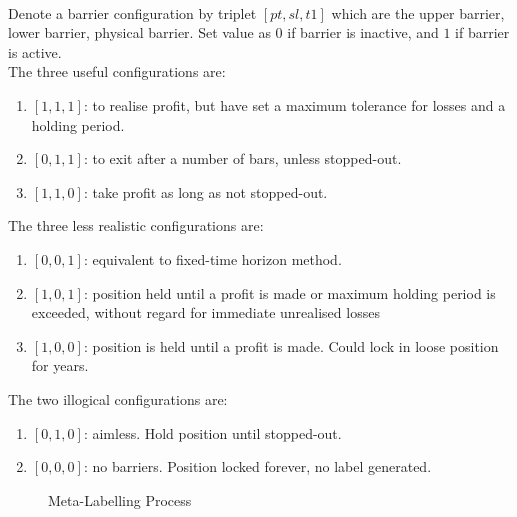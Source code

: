 \begin{remark} \\
Denote a barrier configuration by triplet $[pt, sl, t1]$ which are the upper barrier, lower barrier, physical barrier. Set value as $0$ if barrier is inactive, and $1$ if barrier is active.\\
The three useful configurations are:
\begin{enumerate}[label=\roman*.]
\setlength{\itemsep}{0pt}
\item $[1,1,1]$: to realise profit, but have set a maximum tolerance for losses and a holding period.
\item $[0,1,1]$: to exit after a number of bars, unless stopped-out.
\item $[1,1,0]$: take profit as long as not stopped-out.
\end{enumerate}
The three less realistic configurations are:
\begin{enumerate}[label=\roman*.]
\setlength{\itemsep}{0pt}
\item $[0,0,1]$: equivalent to fixed-time horizon method. 
\item $[1,0,1]$: position held until a profit is made or maximum holding period is exceeded, without regard for immediate unrealised losses
\item $[1,0,0]$: position is held until a profit is made. Could lock in loose position for years.
\end{enumerate}
The two illogical configurations are:
\begin{enumerate}[label=\roman*.]
\setlength{\itemsep}{0pt}
\item $[0,1,0]$: aimless. Hold position until stopped-out.
\item $[0,0,0]$: no barriers. Position locked forever, no label generated.
\end{enumerate}
\end{remark}

\begin{figure}[H]
\centering
\scalebox{0.75}{}
\caption{Meta-Labelling Process}
\end{figure}

